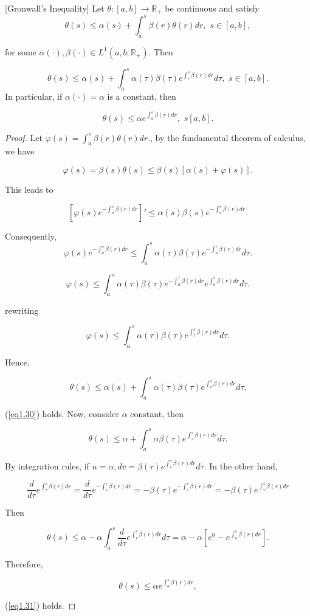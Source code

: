 \begin{prop}\label{GIP}[Gronwall's Inequality]
	Let $\theta:[a,b]\rightarrow \mathbb{R}_{+}$ be continuous and satisfy
	$$\theta (s)\leq \alpha(s)+\int_a^s\beta(r)\theta (r) dr,\,\, s\in [a,b],$$
	
	for some $\alpha(\cdot),\beta (\cdot)\in L^1(a,b;\mathbb{R}_{+})$. Then
	
	\begin{equation}\label{eq1.30}
	\theta(s)\leq \alpha(s)+\int_{a}^{s}\alpha(\tau)\beta(\tau)e^{\int_{\tau}^{s}\beta(r)dr}d\tau,\,\, s\in[a,b].
	\end{equation}
	In particular, if $\alpha(\cdot)=\alpha$ is a constant, then
	
	\begin{equation}\label{eq1.31}
	\theta(s) \leq \alpha e^{\int_{a}^{s}\beta(r)dr},\,\, s[a,b]. 
	\end{equation}
	\end{prop}
\begin{proof}
	Let $\varphi(s)=\int_{a}^{s}\beta(r)\theta(r)dr.$, by the fundamental theorem of calculus, we have
		
	$$\dot{\varphi}(s)=\beta(s)\theta(s)\leq \beta(s)[\alpha(s)+\varphi(s)].$$
	
	This leads to 
	
	$$[\varphi(s)e^{-\int_{a}^{s}\beta(r)dr}]'\leq\alpha(s)\beta(s)e^{-\int_{a}^{s}\beta(r)dr}.$$
	
	Consequently,
	$$\varphi(s)e^{-\int_{a}^{s}\beta(r)dr}\leq \int_{a}^{s}\alpha(\tau)\beta(\tau)e^{-\int_{a}^{\tau}\beta(r)dr}d\tau.$$
	
		$$\varphi(s)\leq \int_{a}^{s}\alpha(\tau)\beta(\tau)e^{-\int_{a}^{\tau}\beta(r)dr}e^{\int_{a}^{s}\beta(r)dr}d\tau .$$
	
	rewriting 
	
	$$\varphi(s)\leq \int_{a}^{s}\alpha(\tau)\beta(\tau)e^{\int_{\tau}^{s}\beta(r)dr}d\tau .$$
	
	Hence,
	
	$$\theta(s)\leq \alpha(s)+\int_{a}^{s}\alpha(\tau)\beta(\tau)e^{\int_{\tau}^{s}\beta(r)dr}d\tau.$$
	
	(\ref{eq1.30}) holds. Now, consider $\alpha$ constant, then
	
	$$\theta(s)\leq \alpha+\int_{a}^{s}\alpha\beta(\tau)e^{\int_{\tau}^{s}\beta(r)dr}d\tau.$$
	
	By integration rules, if $u=\alpha,dv=\beta(\tau)e^{\int_{\tau}^{s}\beta(r)dr}d\tau$. In the other hand,
	
	$$\frac{d}{d\tau}e^{\int_{\tau}^{s}\beta(r)dr}=\frac{d}{d\tau}e^{-\int_{s}^{\tau}\beta(r)dr}=-\beta(\tau) e^{-\int_{s}^{\tau} \beta(r)dr}=-\beta(\tau)e^{\int_{\tau}^{s}\beta(r)dr}$$
	
	Then
	
	$$\theta(s)\leq \alpha-\alpha\int_{a}^{s}\frac{d}{d\tau}e^{\int_{\tau}^{s}\beta(r)dr}d\tau=\alpha-\alpha [e^{0}-e^{\int_{a}^{s}\beta(r)dr}].$$
	
	Therefore,
	
	$$\theta(s)\leq \alpha e^{\int_{a}^{s}\beta(r)dr},$$
	
	(\ref{eq1.31}) holds.
\end{proof}

